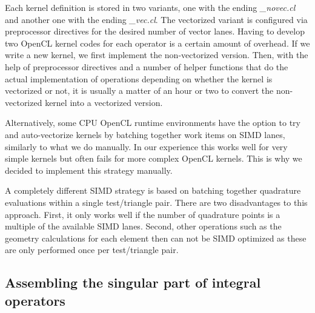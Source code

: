 Each kernel definition is stored in two variants, one with the ending \textit{\_novec.cl} and another one with the ending \textit{\_vec.cl}. The vectorized variant is configured via preprocessor directives for the desired number of vector lanes. Having to develop two OpenCL kernel codes for each operator is a certain amount of overhead. If we write a new kernel, we first implement the non-vectorized version. Then, with the help of preprocessor directives and a number of helper functions that do the actual implementation of operations depending on whether the kernel is vectorized or not, it is usually a matter of an hour or two to convert the non-vectorized kernel into a vectorized version.

Alternatively, some CPU OpenCL runtime environments have the option to try and auto-vectorize kernels by batching together work items on SIMD lanes, similarly to what we do manually. In our experience this works well for very simple kernels but often fails for more complex OpenCL kernels. This is why we decided to implement this strategy manually.

A completely different SIMD strategy is based on batching together quadrature evaluations within a single test/triangle pair. There are two disadvantages to this approach. First, it only works well if the number of quadrature points is a multiple of the available SIMD lanes. Second, other operations such as the geometry calculations for each element then can not be SIMD optimized as these are only performed once per test/triangle pair.


\subsection{Assembling the singular part of integral operators}

